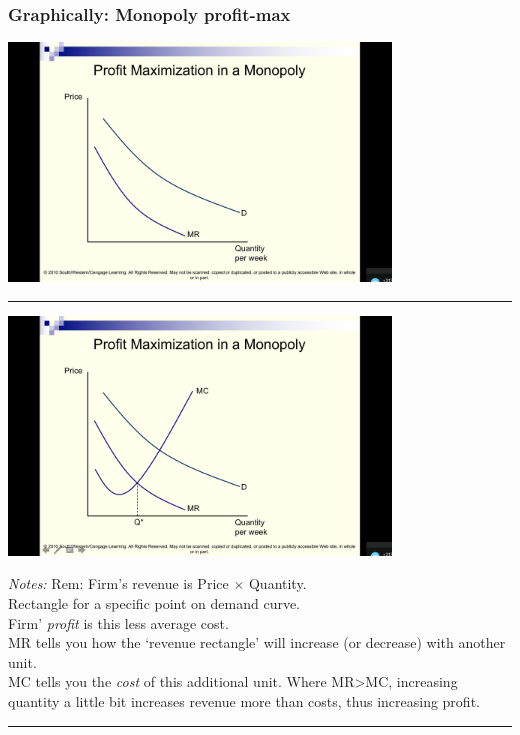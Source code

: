 \documentclass[]{article}
\begin{document}
\hypertarget{graphically-monopoly-profit-max}{%
\subsubsection{Graphically: Monopoly
profit-max}\label{graphically-monopoly-profit-max}}

\includegraphics[height=2.5in]{picsfigs/monopprofit1.png}

\begin{center}\rule{0.5\linewidth}{\linethickness}\end{center}

\includegraphics[height=2.5in]{picsfigs/monopprofit2.png}

\emph{Notes:} Rem: Firm's revenue is Price \(\times\) Quantity.\\
Rectangle for a specific point on demand curve.\\
Firm' \emph{profit} is this less average cost.\\
MR tells you how the `revenue rectangle' will increase (or decrease)
with another unit.\\
MC tells you the \emph{cost} of this additional unit. Where
MR\textgreater MC, increasing quantity a little bit increases revenue
more than costs, thus increasing profit.

\begin{center}\rule{0.5\linewidth}{\linethickness}\end{center}
\end{document}
